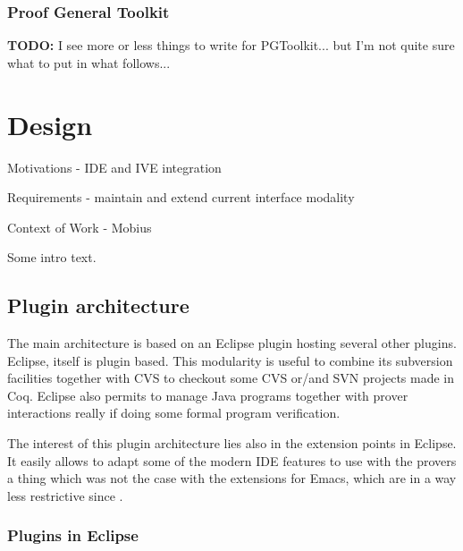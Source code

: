 \documentclass{entcs}
\newcommand{\todo}{\textbf{TODO: }}
\begin{document}
\subsubsection{Proof General Toolkit}
\label{subsubsec:proof-gener-toolk}

\todo{I see more or less things to write for PGToolkit... but I'm not quite
sure what to put in what follows...}\\

\section{Design}
\label{sec:design}

Motivations - IDE and IVE integration %

Requirements - maintain and extend current interface modality %

Context of Work - Mobius %

Some intro text. %

\subsection{Plugin architecture}
\label{subsec:plugin-architecture}

The main architecture is based on an Eclipse plugin hosting several other
plugins. Eclipse, itself is plugin based. This modularity is useful to 
combine its subversion facilities together with CVS to checkout some 
CVS or/and SVN projects made in Coq. Eclipse also permits to manage 
Java programs together with prover interactions really 
if doing some formal program verification.

The interest of this plugin architecture lies also in the extension points 
 in Eclipse. It easily allows to adapt some of the modern 
IDE features to use with the provers a thing which was not the case
with the extensions for Emacs, which are in a way less restrictive
since .

\subsubsection{Plugins in Eclipse}
\label{subsubsec:plugins-eclipse}
\end{document}
